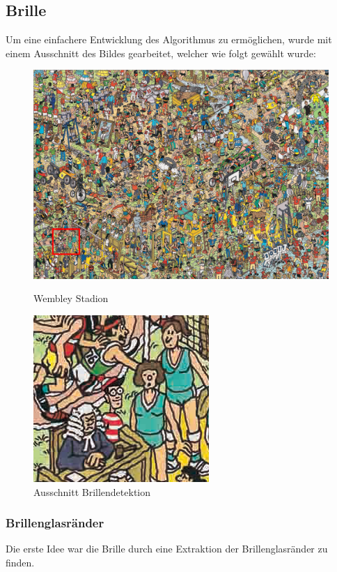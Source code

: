 \documentclass[paper=a4,fontsize=12pt]{scrartcl}
\begin{document}
\subsection*{Brille}
Um eine einfachere Entwicklung des Algorithmus zu ermöglichen, wurde mit einem Ausschnitt des Bildes gearbeitet, welcher wie folgt gewählt wurde:

\begin{figure}[htbp]
\centering
\begin{minipage}{.5\textwidth}
  \centering
  \includegraphics[height=.6\linewidth]{img/WallyWembleyGlassesSelection.png}
  \caption{Wembley Stadion}
\end{minipage}%
\begin{minipage}{.5\textwidth}
  \centering
  \includegraphics[height=.6\linewidth]{img/WallyWembleyCroppedGlasses.png}
  \caption{Ausschnitt Brillendetektion}
\end{minipage}
\end{figure}
\newpage
\subsubsection*{Brillenglasränder} 
Die erste Idee war die Brille durch eine Extraktion der Brillenglasränder zu finden.
\end{document}
